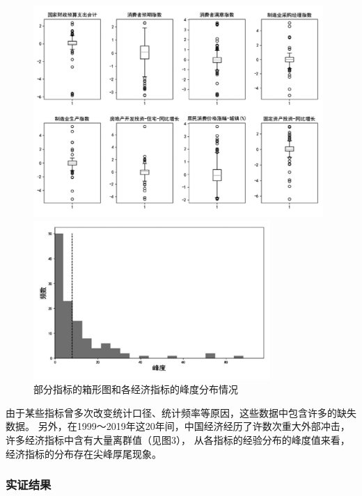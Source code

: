 \begin{figure}[H]
    \begin{minipage}[t]{1\textwidth}
    \centering
    \includegraphics[width=11cm]{pics/some-indexes.jpg}
    \end{minipage}
    \begin{minipage}[t]{1\textwidth}
    \centering
    \includegraphics[width=9cm]{pics/fengdu.jpg}
    \end{minipage}
    \caption{\small 部分指标的箱形图和各经济指标的峰度分布情况}
\end{figure}

由于某些指标曾多次改变统计口径、统计频率等原因，这些数据中包含许多的缺失数据。
另外，在1999～2019年这20年间，中国经济经历了许数次重大外部冲击，许多经济指标中含有大量离群值（见图3），
从各指标的经验分布的峰度值来看，经济指标的分布存在尖峰厚尾现象。

\subsubsection{实证结果}

